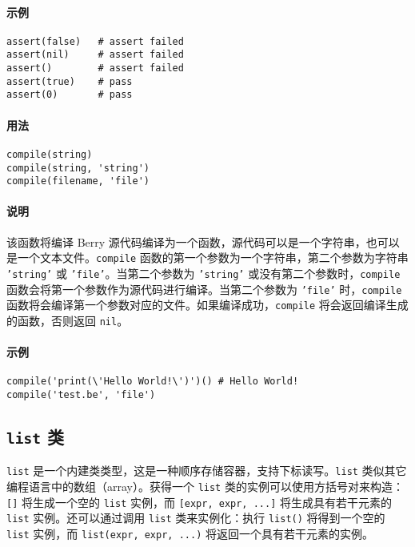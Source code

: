\paragraph{示例}
\begin{lstlisting}[language=berry, numbers=none]
assert(false)   # assert failed
assert(nil)     # assert failed
assert()        # assert failed
assert(true)    # pass
assert(0)       # pass
\end{lstlisting}


\paragraph{用法}
\begin{lstlisting}[language=berry, numbers=none]
compile(string)
compile(string, 'string')
compile(filename, 'file')
\end{lstlisting}

\paragraph{说明}
该函数将编译 Berry 源代码编译为一个函数，源代码可以是一个字符串，也可以是一个文本文件。\texttt{compile} 函数的第一个参数为一个字符串，第二个参数为字符串 \texttt{'string'} 或 \texttt{'file'}。当第二个参数为 \texttt{'string'} 或没有第二个参数时，\texttt{compile} 函数会将第一个参数作为源代码进行编译。当第二个参数为 \texttt{'file'} 时，\texttt{compile} 函数将会编译第一个参数对应的文件。如果编译成功，\texttt{compile} 将会返回编译生成的函数，否则返回 \texttt{nil}。

\paragraph{示例}
\begin{lstlisting}[language=berry, numbers=none]
compile('print(\'Hello World!\')')() # Hello World!
compile('test.be', 'file')
\end{lstlisting}


\subsection{\texttt{list} 类}

\texttt{list} 是一个内建类类型，这是一种顺序存储容器，支持下标读写。\texttt{list} 类似其它编程语言中的数组（array）。获得一个 \texttt{list} 类的实例可以使用方括号对来构造：\texttt{[]} 将生成一个空的 \texttt{list} 实例，而 \texttt{[expr, expr, ...]} 将生成具有若干元素的 \texttt{list} 实例。还可以通过调用 \texttt{list} 类来实例化：执行 \texttt{list()} 将得到一个空的 \texttt{list} 实例，而 \texttt{list(expr, expr, ...)} 将返回一个具有若干元素的实例。

